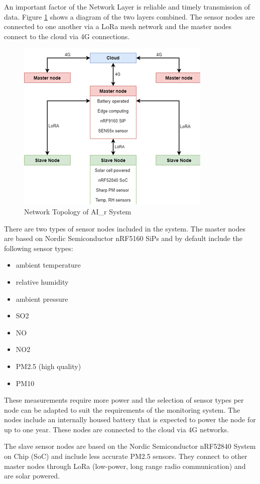 \documentclass[a4paper,twoside,12pt]{report}
\begin{document}
An important factor of the Network Layer is reliable and timely transmission of data.
\newline \newline
Figure \ref{fig:NetworkTopology} shows a diagram of the two layers combined. The sensor nodes are connected to one another via a LoRa mesh network and the master nodes connect to the cloud via 4G connections.

\begin{figure}[ht]
	\centering
	\includegraphics[width=0.4\linewidth]{images/Network_topology_of_AI_r_system_cropped.png}
	\caption{Network Topology of AI\_r System}
	\label{fig:NetworkTopology}
\end{figure}

There are two types of sensor nodes included in the system. The master nodes are based on Nordic Semiconductor nRF5160 SiPs and by default include the following sensor types:
\begin{itemize}
    \item ambient temperature
    \item relative humidity
    \item ambient pressure
    \item SO2
    \item NO
    \item NO2
    \item PM2.5 (high quality)
    \item PM10
\end{itemize}

These measurements require more power and the selection of sensor types per node can be adapted to suit the requirements of the monitoring system. The nodes include an internally housed battery that is expected to power the node for up to one year. These nodes are connected to the cloud via 4G networks.
\newline

The slave sensor nodes are based on the Nordic Semiconductor nRF52840 System on Chip (SoC) and include less accurate PM2.5 sensors. They connect to other master nodes through LoRa (low-power, long range radio communication) and are solar powered.
\newline 
\end{document}
